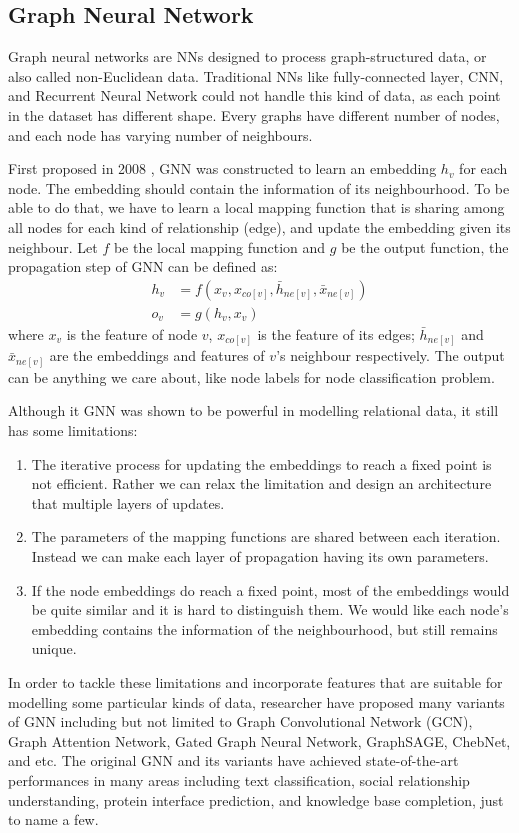 \documentclass[12pt]{report}
\begin{document}
\subsection{Graph Neural Network}
Graph neural networks are NNs designed to process graph-structured data, or also called non-Euclidean data. Traditional NNs like fully-connected layer, CNN, and Recurrent Neural Network could not handle this kind of data, as each point in the dataset has different shape. Every graphs have different number of nodes, and each node has varying number of neighbours.

  First proposed in 2008 \cite{scarselli_graph_2009}, GNN was constructed to learn an embedding $h_v$ for each node. The embedding should contain the information of its neighbourhood. To be able to do that, we have to learn a local mapping function that is sharing among all nodes for each kind of relationship (edge), and update the embedding given its neighbour. Let $f$ be the local mapping function and $g$ be the output function, the propagation step of GNN can be defined as:
\begin{align*}
h_v &= f(x_v, x_{co[v]},\bar{h}_{ne[v]}, \bar{x}_{ne[v]})\\
o_v &= g(h_v, x_v)
\end{align*}
where $x_v$ is the feature of node $v$, $x_{co[v]}$ is the feature of its edges; $\bar{h}_{ne[v]}$ and $\bar{x}_{ne[v]}$ are the embeddings and features of $v$'s neighbour respectively. The output can be anything we care about, like node labels for node classification problem.

Although it GNN was shown to be powerful in modelling relational data, it still has some limitations:
\begin{enumerate}
\item The iterative process for updating the embeddings to reach a fixed point is not efficient. Rather we can relax the limitation and design an architecture that multiple layers of updates.
\item The parameters of the mapping functions are shared between each iteration. Instead we can make each layer of propagation having its own parameters.
\item If the node embeddings do reach a fixed point, most of the embeddings would be quite similar and it is hard to distinguish them. We would like each node's embedding contains the information of the neighbourhood, but still remains unique.
\end{enumerate}

In order to tackle these limitations and incorporate features that are suitable for modelling some particular kinds of data, researcher have proposed many variants of GNN including but not limited to Graph Convolutional Network (GCN), Graph Attention Network, Gated Graph Neural Network, GraphSAGE, ChebNet, and etc. The original GNN and its variants have achieved state-of-the-art performances in many areas including text classification, social relationship understanding, protein interface prediction, and knowledge base completion, just to name a few.
\end{document}
